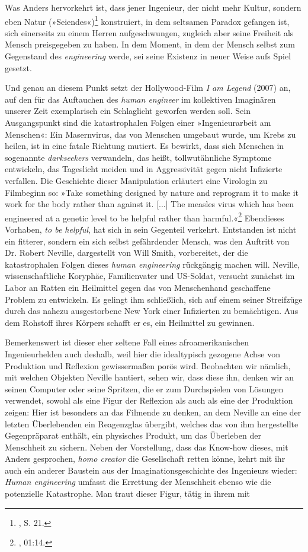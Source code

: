 \documentclass[%
	fontsize=10pt,%
	twoside,%
	headings=optiontoheadandtoc,%
	showtrims]{scrbook}
\begin{document}
\par Was Anders hervorkehrt ist, dass jener Ingenieur, der nicht mehr Kultur, sondern eben Natur (»Seiendes«)\footnote{\cite[][]{anders1981a}, S. 21.}  konstruiert, in dem seltsamen Paradox gefangen ist, sich einerseits zu einem Herren aufgeschwungen, zugleich aber seine Freiheit als Mensch preisgegeben zu haben. In dem Moment, in dem der Mensch selbst zum Gegenstand des \emph{engineering} werde, sei seine Existenz in neuer Weise aufs Spiel gesetzt.\par Und genau an diesem Punkt setzt der Hollywood-Film \emph{I am Legend} (2007) an, auf den für das Auftauchen des \emph{human engineer} im kollektiven Imaginären unserer Zeit exemplarisch ein Schlaglicht geworfen werden soll. Sein Ausgangspunkt sind die katastrophalen Folgen einer »Ingenieurarbeit am Menschen«: Ein Masernvirus, das von Menschen umgebaut wurde, um Krebs zu heilen, ist in eine fatale Richtung mutiert. Es bewirkt, dass sich Menschen in sogenannte \emph{darkseekers} verwandeln, das heißt, tollwutähnliche Symptome entwickeln, das Tageslicht meiden und in Aggressivität gegen nicht Infizierte verfallen. Die Geschichte dieser Manipulation erläutert eine Virologin zu Filmbeginn so: »Take something designed by nature and reprogram it to make it work for the body rather than against it. {[}...{]} The measles virus which has been engineered at a genetic level to be helpful rather than harmful.«\footnote{\cite[][]{lawrence2007a}, 01:14.}  Ebendieses Vorhaben, \emph{to be helpful}, hat sich in sein Gegenteil verkehrt. Entstanden ist nicht ein fitterer, sondern ein sich selbst gefährdender Mensch, was den Auftritt von Dr. Robert Neville, dargestellt von Will Smith, vorbereitet, der die katastrophalen Folgen dieses \emph{human engineering} rückgängig machen will. Neville, wissenschaftliche Koryphäe, Familienvater und US-Soldat, versucht zunächst im Labor an Ratten ein Heilmittel gegen das von Menschenhand geschaffene Problem zu entwickeln. Es gelingt ihm schließlich, sich auf einem seiner Streifzüge durch das nahezu ausgestorbene New York einer Infizierten zu bemächtigen. Aus dem Rohstoff ihres Körpers schafft er es, ein Heilmittel zu gewinnen.\par Bemerkenswert ist dieser eher seltene Fall eines afroamerikanischen Ingenieurhelden auch deshalb, weil hier die idealtypisch gezogene Achse von Produktion und Reflexion gewissermaßen porös wird. Beobachten wir nämlich, mit welchen Objekten Neville hantiert, sehen wir, dass diese ihn, denken wir an seinen Computer oder seine Spritzen, die er zum Durchspielen von Lösungen verwendet, sowohl als eine Figur der Reflexion als auch als eine der Produktion zeigen: Hier ist besonders an das Filmende zu denken, an dem Neville an eine der letzten Überlebenden ein Reagenzglas übergibt, welches das von ihm hergestellte Gegenpräparat enthält, ein physisches Produkt, um das Überleben der Menschheit zu sichern. Neben der Vorstellung, dass das Know-how dieses, mit Anders gesprochen, \emph{homo creator} die Gesellschaft retten könne, kehrt mit ihr auch ein anderer Baustein aus der Imaginationsgeschichte des Ingenieurs wieder: \emph{Human engineering} umfasst die Errettung der Menschheit ebenso wie die potenzielle Katastrophe. Man traut dieser Figur, tätig in ihrem mit 
\end{document}
